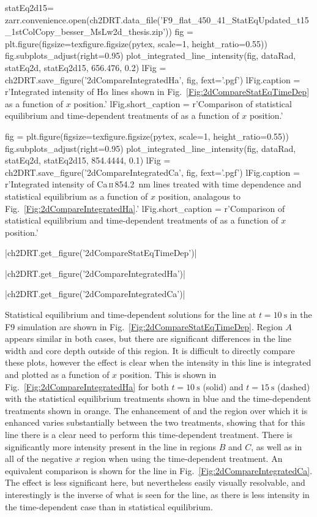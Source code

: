 \begin{pycode}[2DRT]
statEq2d15= zarr.convenience.open(ch2DRT.data_file('F9_flat_450_41_StatEqUpdated_t15_1stColCopy_besser_MsLw2d_thesis.zip'))
fig = plt.figure(figsize=texfigure.figsize(pytex, scale=1, height_ratio=0.55))
fig.subplots_adjust(right=0.95)
plot_integrated_line_intensity(fig, dataRad, statEq2d, statEq2d15, 656.476, 0.2)
lFig = ch2DRT.save_figure('2dCompareIntegratedHa', fig, fext='.pgf')
lFig.caption = r'Integrated intensity of H$\alpha$ lines shown in Fig.~\ref{Fig:2dCompareStatEqTimeDep} as a function of $x$ position.'
lFig.short_caption = r'Comparison of statistical equilibrium and time-dependent treatments of \Ha{} as a function of $x$ position.'

fig = plt.figure(figsize=texfigure.figsize(pytex, scale=1, height_ratio=0.55))
fig.subplots_adjust(right=0.95)
plot_integrated_line_intensity(fig, dataRad, statEq2d, statEq2d15, 854.4444, 0.1)
lFig = ch2DRT.save_figure('2dCompareIntegratedCa', fig, fext='.pgf')
lFig.caption = r'Integrated intensity of Ca\,\textsc{ii}\,\SI{854.2}{\nano\metre} lines treated with time dependence and statistical equilibrium as a function of $x$ position, analagous to Fig.~\ref{Fig:2dCompareIntegratedHa}.'
lFig.short_caption = r'Comparison of statistical equilibrium and time-dependent treatments of \CaLine{} as a function of $x$ position.'

\end{pycode}

\py[2DRT]|ch2DRT.get_figure('2dCompareStatEqTimeDep')|

\py[2DRT]|ch2DRT.get_figure('2dCompareIntegratedHa')|

\py[2DRT]|ch2DRT.get_figure('2dCompareIntegratedCa')|

Statistical equilibrium and time-dependent solutions for the \Ha{} line at $t=\SI{10}{\second}$ in the F9 simulation are shown in Fig.~\ref{Fig:2dCompareStatEqTimeDep}.
Region $A$ appears similar in both cases, but there are significant differences in the line width and core depth outside of this region.
It is difficult to directly compare these plots, however the effect is clear when the intensity in this line is integrated and plotted as a function of $x$ position.
This is shown in Fig.~\ref{Fig:2dCompareIntegratedHa} for both $t=\SI{10}{\second}$ (solid) and $t=\SI{15}{\second}$ (dashed) with the statistical equilibrium treatments shown in blue and the time-dependent treatments shown in orange.
The enhancement of \Ha{} and the region over which it is enhanced varies substantially between the two treatments, showing that for this line there is a clear need to perform this time-dependent treatment.
There is significantly more intensity present in the line in regions $B$ and $C$, as well as in all of the negative $x$ region when using the time-dependent treatment.
An equivalent comparison is shown for the \CaLine{} line in Fig.~\ref{Fig:2dCompareIntegratedCa}.
The effect is less significant here, but nevertheless easily visually resolvable, and interestingly is the inverse of what is seen for the \Ha{} line, as there is less intensity in the time-dependent case than in statistical equilibrium.

